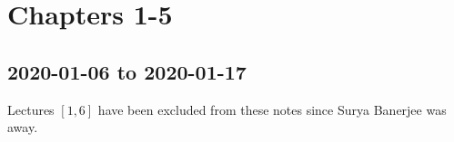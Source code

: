 \chapter{Chapters 1-5}
\section{2020-01-06 to 2020-01-17}
Lectures $ [1,6] $ have been excluded from these notes since
Surya Banerjee was away.
